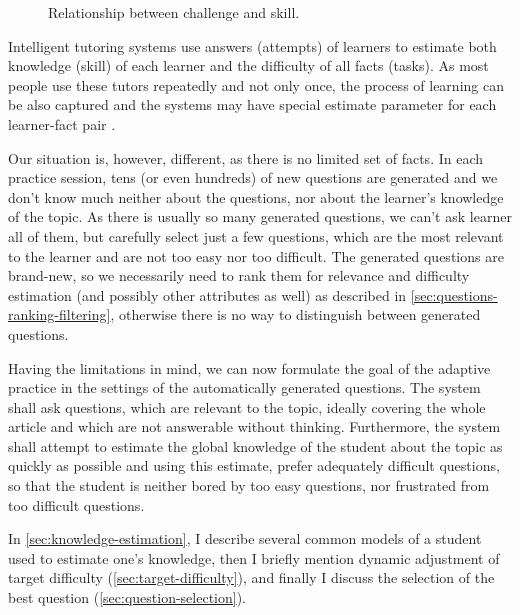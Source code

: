 \documentclass[12pt, twoside]{fithesis2}
\renewcommand{\_}{\leavevmode \kern0.07em\vbox{\hrule width0.4em}}
\begin{document}
\begin{figure}[h]
  \centering
  \caption{Relationship between challenge and skill.}
  \label{fig:flow}
\end{figure}

Intelligent tutoring systems use answers (attempts) of learners to estimate both knowledge (skill) of each learner and the difficulty of all facts (tasks).
As most people use these tutors repeatedly and not only once, the process of learning can be also captured
and the systems may have special estimate parameter for each learner-fact pair \cite{slepe-mapy}.

Our situation is, however, different, as there is no limited set of facts.
In each practice session, tens (or even hundreds) of new questions are generated
and we don't know much neither about the questions, nor about the learner's knowledge of the topic.
As there is usually so many generated questions, we can't ask learner all of them,
but carefully select just a few questions, which are the most relevant to the learner and are not too easy nor too difficult.
The generated questions are brand-new, so we necessarily need to rank them for relevance and difficulty estimation (and possibly other attributes as well) as described in \autoref{sec:questions-ranking-filtering},
otherwise there is no way to distinguish between generated questions.

Having the limitations in mind, we can now formulate the goal of the adaptive practice in the settings of the automatically generated questions.
The system shall ask questions, which are relevant to the topic, ideally covering the whole article and which are not answerable without thinking. Furthermore, the system shall attempt to estimate the global knowledge of the student about the topic as quickly as possible and using this estimate, prefer adequately difficult questions, so that the student is neither bored by too easy questions, nor frustrated from too difficult questions.

In \autoref{sec:knowledge-estimation}, I describe several common models of a student used to estimate one's knowledge, then I briefly mention dynamic adjustment of target difficulty (\autoref{sec:target-difficulty}),
and finally I discuss the selection of the best question (\autoref{sec:question-selection}).
\end{document}
